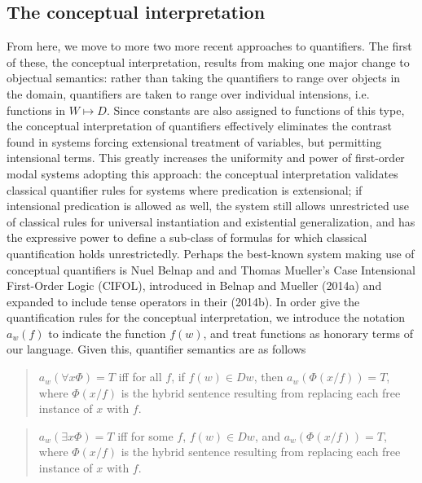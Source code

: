 \documentclass[]{article}
\begin{document}
\subsection{The conceptual interpretation}
From here, we move to more two more recent approaches to quantifiers. The first of these, the conceptual interpretation, results from making one major change to objectual semantics: rather than taking the quantifiers to range over objects in the domain, quantifiers are taken to range over individual intensions, i.e. functions in $W \mapsto D$. Since constants are also assigned to functions of this type, the conceptual interpretation of quantifiers effectively eliminates the contrast found in systems forcing extensional treatment of variables, but permitting intensional terms. This greatly increases the uniformity and power of first-order modal systems adopting this approach: the conceptual interpretation validates classical quantifier rules for systems where predication is extensional; if intensional predication is allowed as well, the system still allows unrestricted use of classical rules for universal instantiation and existential generalization, and has the expressive power to define a sub-class of formulas for which classical quantification holds unrestrictedly. Perhaps the best-known system making use of conceptual quantifiers is Nuel Belnap and and Thomas Mueller's Case Intensional First-Order Logic (CIFOL), introduced in Belnap and Mueller (2014a) and expanded to include tense operators in their (2014b). In order give the quantification rules for the conceptual interpretation, we introduce the notation $a_{w}(f)$ to indicate the function $f(w)$, and treat functions as honorary terms of our language. Given this, quantifier semantics are as follows
\begin{quote}
$a_{w}(\forall x \Phi) = T$ iff for all $f$, if $f(w) \in Dw$, then $a_{w}(\Phi(x/f)) = T$, where $\Phi(x/f)$ is the hybrid sentence resulting from replacing each free instance of $x$ with $f$.
\end{quote}
\begin{quote}
$a_{w}(\exists x \Phi) = T$ iff for some $f$, $f(w) \in Dw$, and $a_{w}(\Phi(x/f)) = T$, where $\Phi(x/f)$ is the hybrid sentence resulting from replacing each free instance of $x$ with $f$.
\end{quote}
 
\end{document}
